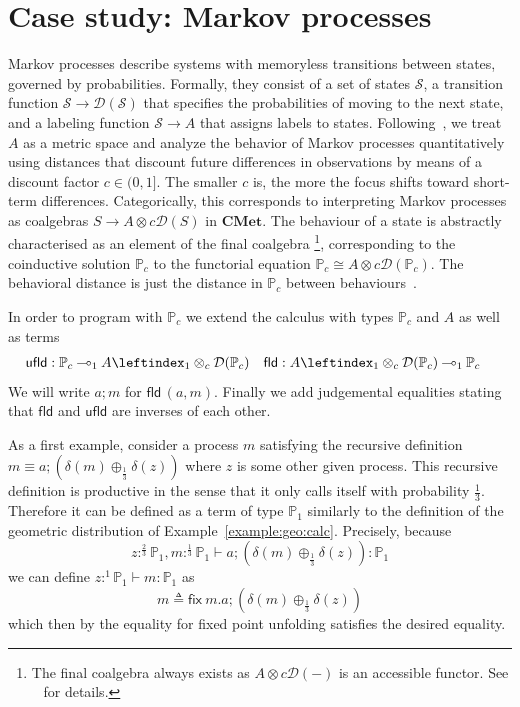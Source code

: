 \documentclass[a4paper,UKenglish,cleveref, autoref, thm-restate]{lipics-v2021}
\newcommand{\lol}{\mathbin{\multimap}}
\newcommand{\cat}[1]{\mathbf{#1}}
\newcommand{\CMet}{\cat{CMet}}
\newcommand{\mprod}{\otimes}
\newcommand{\D}{\mathcal{D}}
\newcommand{\pair}[2]{\otimes_{#1,#2}}
\renewcommand{\pair}[2]{\leftindex_{#1}\otimes_{#2}} %
\newcommand{\iso}{\cong}
\newcommand{\Proc}[1][\discfact]{\mathbb{P}_{#1}}
\newcommand{\Labels}{A}
\newcommand{\State}{\mathcal S}
\newcommand{\ts}{\vdash}
\newcommand{\hastype}[3]{#1\ts #2 : #3}
\newcommand{\semProc}[1][\discfact]{\mathbb{P}_{#1}}
\newcommand{\semLabels}{A}
\newcommand{\fix}[2]{\mathsf{fix~} #1 . #2 }
\newcommand{\unfold}{\mathsf{ufld}}
\newcommand{\fold}{\mathsf{fld}}
\newcommand{\proc}[2]{#1 \cdot #2}
\renewcommand{\proc}[2]{#1 ; #2}
\newcommand{\discfact}{c} %
\newcommand{\jeq}{\equiv}
\newcommand{\defeq}{\triangleq}
\begin{document}

\section{Case study: Markov processes}
\label{sec:markov}

Markov processes describe systems with memoryless transitions between states, governed by probabilities. Formally, they consist of a set of states $\State$, a transition function $\State \to \D(\State)$ that specifies the probabilities of moving to the next state, and a labeling function $\State \to A$ that assigns labels to states. Following~\cite{Breugel05}, we treat $A$ as a metric space and analyze the behavior of Markov processes quantitatively using distances that discount future differences in observations by means of a discount factor $\discfact \in (0,1]$. The smaller $\discfact$ is, the more the focus shifts toward short-term differences. Categorically, this corresponds to interpreting Markov processes as coalgebras $S \to A \otimes c\D(S)$ in $\CMet$.
The behaviour of a state is abstractly characterised as an element of the final coalgebra%
\footnote{The final coalgebra always exists as $\semLabels\mprod\discfact\D(-)$ is an accessible functor. See ~\cite{BreugelHMW05,Breugel05} for details.}, corresponding
to the coinductive solution $\semProc[\discfact]$ to the functorial equation $\semProc \iso \semLabels\mprod\discfact\D(\semProc)$. The behavioral distance 
is just the distance in $\Proc$ between behaviours~\cite{BreugelHMW05}. 

In order to program with $\semProc$ we extend the calculus with types $\Proc$ and $\Labels$ as well as terms 
\begin{align*}
\unfold & : \Proc \lol_1 \Labels\pair1\discfact\D(\Proc) &
\fold & : \Labels \pair1\discfact \D(\Proc) \lol_1 \Proc
\end{align*}
We will write $\proc a{m}$ for $\fold\,(a,m)$. Finally we add judgemental equalities stating that $\fold$ and $\unfold$ are inverses of each other.

As a first example, consider a process $m$ satisfying the recursive definition $m \jeq \proc a{(\delta(m) \oplus_{\frac13} \delta(z))}$ where $z$ is some other given process. 
This recursive definition is productive in the sense that it only calls itself with probability $\frac13$. Therefore it can be defined as a term of type $\Proc[1]$ 
similarly to the definition of the geometric distribution of Example~\ref{example:geo:calc}. Precisely, because 
\[
  \hastype{z :^{\frac23} \Proc[1], m :^{\frac13}\Proc[1]}{\proc a{(\delta(m) \oplus_{\frac13} \delta(z))}}{\Proc[1]}
\]
we can define $\hastype {z :^1 \Proc[1]}{m}{\Proc[1]}$ as 
\[
  m\defeq \fix{m}{\proc a{(\delta(m) \oplus_{\frac13} \delta(z))}}
\]
which then by the equality for fixed point unfolding satisfies the desired equality. 
\end{document}
